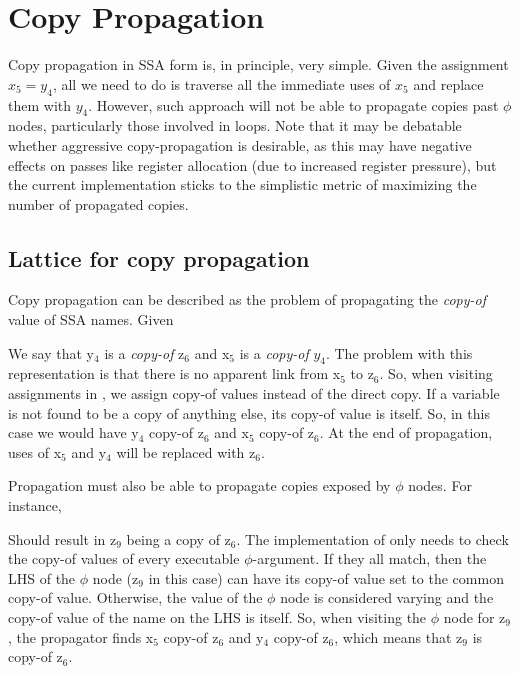 
\section{Copy Propagation}
\label{novillo:sec:copy-prop}

Copy propagation in SSA form is, in principle, very simple.  Given
the assignment $x_5 = y_4$, all we need to do is traverse all the
immediate uses of $x_5$ and replace them with $y_4$.  However,
such approach will not be able to propagate copies past $\phi$
nodes, particularly those involved in loops.  Note that it may be
debatable whether aggressive copy-propagation is desirable, as
this may have negative effects on passes like register allocation
(due to increased register pressure), but the current
implementation sticks to the simplistic metric of maximizing the
number of propagated copies.

\subsection{Lattice for copy propagation}

Copy propagation can be described as the problem of propagating
the \textit{copy-of} value of SSA names.  Given

\begin{center}
\parbox{1in}{}
\end{center}

We say that y$_4$ is a \textit{copy-of} z$_6$ and x$_5$ is a
\textit{copy-of} $y_4$.  The problem with this representation is
that there is no apparent link from x$_5$ to z$_6$.  So, when
visiting assignments in , we assign
copy-of values instead of the direct copy.  If a variable is not
found to be a copy of anything else, its copy-of value is itself.
So, in this case we would have y$_4$ copy-of z$_6$ and x$_5$
copy-of z$_6$.  At the end of propagation, uses of x$_5$ and y$_4$
will be replaced with z$_6$.


Propagation must also be able to propagate copies exposed by
$\phi$ nodes.  For instance,

\begin{center}
\parbox{2in}{}
\end{center}

Should result in z$_9$ being a copy of z$_6$.  The implementation
of  only needs to check the copy-of
values of every executable $\phi$-argument.  If they all match,
then the LHS of the $\phi$ node (z$_9$ in this case) can have its
copy-of value set to the common copy-of value.  Otherwise, the
value of the $\phi$ node is considered varying and the copy-of
value of the name on the LHS is itself.  So, when visiting the
$\phi$ node for z$_9$, the propagator finds x$_5$ copy-of z$_6$
and y$_4$ copy-of z$_6$, which means that z$_9$ is copy-of z$_6$.

